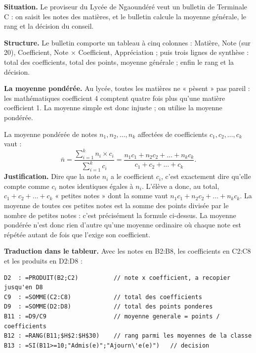 \documentclass[11pt]{article}
\newcommand{\cle}[1]{{\popxbold\color{popdark}#1}}
\newcounter{popsec}
\newcounter{popsub}
\newcommand{\courssub}[1]{%
  \stepcounter{popsub}%
  \par\vspace{9pt}\noindent{\popxbold\fontsize{11.5}{13}\selectfont\color{popink}{\color{poporange}\thepopsec.\thepopsub}\hspace{6pt}#1}\par\nopagebreak\vspace{4pt}
}
\begin{document}
\courssub{Étude de cas n° 2 : le bulletin de notes}

\textbf{Situation.} Le proviseur du Lycée de Ngaoundéré veut un bulletin de Terminale C : on saisit les notes des matières, et le bulletin calcule la moyenne générale, le rang et la décision du conseil.

\textbf{Structure.} Le bulletin comporte un tableau à cinq colonnes : Matière, Note (sur 20), Coefficient, Note $\times$ Coefficient, Appréciation ; puis trois lignes de synthèse : total des coefficients, total des points, moyenne générale ; enfin le rang et la décision.

\textbf{La moyenne pondérée.} Au lycée, toutes les matières ne « pèsent » pas pareil : les mathématiques coefficient 4 comptent quatre fois plus qu'une matière coefficient 1. La moyenne simple est donc injuste ; on utilise la \cle{moyenne pondérée}.

\begin{propriete}
La moyenne pondérée de notes $n_1, n_2, \dots, n_k$ affectées de coefficients $c_1, c_2, \dots, c_k$ vaut :
\[ \bar{n} = \frac{\sum_{i=1}^{k} n_i \times c_i}{\sum_{i=1}^{k} c_i} = \frac{n_1 c_1 + n_2 c_2 + \dots + n_k c_k}{c_1 + c_2 + \dots + c_k}. \]
\textbf{Justification.} Dire que la note $n_i$ a le coefficient $c_i$, c'est exactement dire qu'elle compte comme $c_i$ notes identiques égales à $n_i$. L'élève a donc, au total, $c_1 + c_2 + \dots + c_k$ « petites notes » dont la somme vaut $n_1 c_1 + n_2 c_2 + \dots + n_k c_k$. La moyenne de toutes ces petites notes est la somme des points divisée par le nombre de petites notes : c'est précisément la formule ci-dessus. La moyenne pondérée n'est donc rien d'autre qu'une moyenne ordinaire où chaque note est répétée autant de fois que l'exige son coefficient.
\end{propriete}

\textbf{Traduction dans le tableur.} Avec les notes en B2:B8, les coefficients en C2:C8 et les produits en D2:D8 :

\begin{lstlisting}
D2  : =PRODUIT(B2;C2)          // note x coefficient, a recopier jusqu'en D8
C9  : =SOMME(C2:C8)            // total des coefficients
D9  : =SOMME(D2:D8)            // total des points ponderes
B11 : =D9/C9                   // moyenne generale = points / coefficients
B12 : =RANG(B11;$H$2:$H$30)    // rang parmi les moyennes de la classe
B13 : =SI(B11>=10;"Admis(e)";"Ajourn\'e(e)")   // decision
\end{lstlisting}
\end{document}
